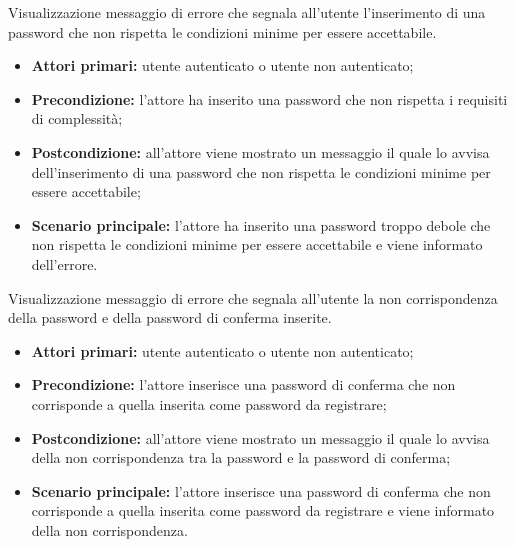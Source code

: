 Visualizzazione messaggio di errore che segnala all'utente l'inserimento di una password che non rispetta le condizioni minime per essere accettabile.
\begin{itemize}
    \item \textbf{Attori primari:} utente autenticato o utente non autenticato;
    \item \textbf{Precondizione:} l'attore ha inserito una password che non rispetta i requisiti di complessità;
    \item \textbf{Postcondizione:} all'attore viene mostrato un messaggio il quale lo avvisa dell'inserimento di una password che non rispetta le condizioni minime per essere accettabile;
    \item \textbf{Scenario principale:} l'attore ha inserito una password troppo debole che non rispetta le condizioni minime per essere accettabile e viene informato dell'errore.
\end{itemize}


Visualizzazione messaggio di errore che segnala all'utente la non corrispondenza della password e della password di conferma inserite.
\begin{itemize}
    \item \textbf{Attori primari:} utente autenticato o utente non autenticato;
    \item \textbf{Precondizione:} l'attore inserisce una password di conferma che non corrisponde a quella inserita come password da registrare;
    \item \textbf{Postcondizione:} all'attore viene mostrato un messaggio il quale lo avvisa della non corrispondenza tra la password e la password di conferma;
    \item \textbf{Scenario principale:} l'attore inserisce una password di conferma che non corrisponde a quella inserita come password da registrare e viene informato della non corrispondenza.
\end{itemize}


